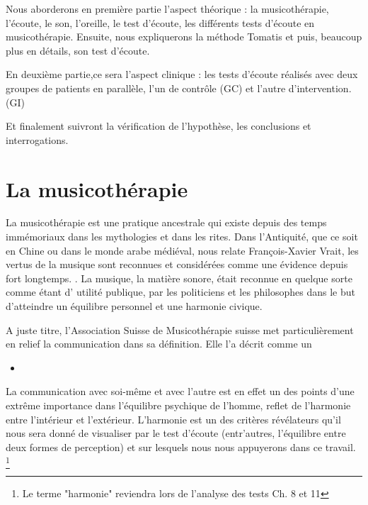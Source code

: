 Nous aborderons en première partie l'aspect théorique : la musicothérapie, l'écoute, le son, l'oreille, le 
test d'écoute, les différents tests d'écoute en musicothérapie.  Ensuite, nous 
expliquerons  la méthode Tomatis
et puis, beaucoup plus en détails, son test d'écoute.
 
En deuxième partie,ce sera l'aspect clinique : les tests d'écoute réalisés  avec deux groupes 
de patients en parallèle, l'un de contrôle (GC) et l'autre d'intervention.(GI)

Et finalement suivront la vérification de l'hypothèse, les conclusions et 
interrogations. 


	


\chapter{La musicothérapie}

La musicothérapie est une pratique ancestrale qui existe depuis des
temps immémoriaux dans les mythologies et dans les rites. Dans l'Antiquité, que ce soit en Chine ou dans le monde arabe 
médiéval, nous relate François-Xavier Vrait,  	 
les vertus de la musique sont reconnues et considérées comme une évidence depuis 
fort longtemps. 
  \autocite[ch. III, p. 
96]{vrait_musicotherapie_2018}.
La musique, la matière sonore, était  reconnue en quelque sorte comme étant d' utilité
publique, 
par les  politiciens  et les philosophes dans le but d'atteindre un
équilibre personnel et une harmonie civique.
 	 
A juste titre, l'Association Suisse de Musicothérapie suisse met particulièrement en relief 
la communication dans sa définition. Elle l'a décrit comme un 
 
\begin{itemize}
\item {}
\end{itemize}

La communication avec soi-même et avec l'autre est en effet un des
points 
d'une extrême importance dans l'équilibre psychique de l'homme, reflet
de 
l'harmonie entre l'intérieur et l'extérieur. L'harmonie est un des  
critères révélateurs qu'il nous sera donné de visualiser par le test
d'écoute (entr'autres, l'équilibre entre deux formes de perception) et sur
lesquels 
nous nous appuyerons  
dans ce travail.  \footnote{Le terme "harmonie" reviendra lors de
  l'analyse des tests Ch. 8 et 11}


